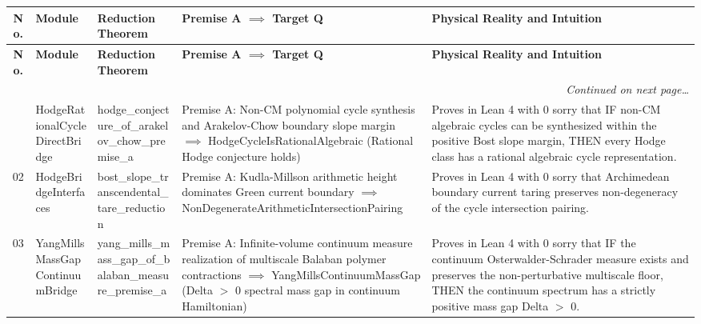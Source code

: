 \documentclass[11pt,a4paper]{article}
\begin{document}
\begin{longtable}{cp{2.8cm}>{\raggedright\arraybackslash}p{4.0cm}>{\raggedright\arraybackslash}p{4.0cm}>{\raggedright\arraybackslash}p{4.5cm}}
\toprule
\textbf{No.} & \textbf{Module} & \textbf{Reduction Theorem} & \textbf{Premise A $\implies$ Target Q} & \textbf{Physical Reality and Intuition} \\
\midrule
\endfirsthead
\toprule
\textbf{No.} & \textbf{Module} & \textbf{Reduction Theorem} & \textbf{Premise A $\implies$ Target Q} & \textbf{Physical Reality and Intuition} \\
\midrule
\endhead
\midrule
\multicolumn{5}{r}{\textit{Continued on next page\dots}} \\
\bottomrule
\endfoot
\bottomrule
\endlastfoot
01 & {\scriptsize\ttfamily Hodge\allowbreak Rational\allowbreak Cycle\allowbreak Direct\allowbreak Bridge} & {\scriptsize\ttfamily hodge\_\allowbreak conjecture\_\allowbreak of\_\allowbreak arakelov\_\allowbreak chow\_\allowbreak premise\_\allowbreak a} & {\scriptsize Premise A: Non-CM polynomial cycle synthesis and Arakelov-Chow boundary slope margin $\implies$ HodgeCycleIsRationalAlgebraic (Rational Hodge conjecture holds)} & Proves in Lean 4 with 0 sorry that IF non-CM algebraic cycles can be synthesized within the positive Bost slope margin, THEN every Hodge class has a rational algebraic cycle representation. \\
02 & {\scriptsize\ttfamily Hodge\allowbreak Bridge\allowbreak Interfaces} & {\scriptsize\ttfamily bost\_\allowbreak slope\_\allowbreak transcendental\_\allowbreak tare\_\allowbreak reduction} & {\scriptsize Premise A: Kudla-Millson arithmetic height dominates Green current boundary $\implies$ NonDegenerateArithmeticIntersectionPairing} & Proves in Lean 4 with 0 sorry that Archimedean boundary current taring preserves non-degeneracy of the cycle intersection pairing. \\
03 & {\scriptsize\ttfamily Yang\allowbreak Mills\allowbreak Mass\allowbreak Gap\allowbreak Continuum\allowbreak Bridge} & {\scriptsize\ttfamily yang\_\allowbreak mills\_\allowbreak mass\_\allowbreak gap\_\allowbreak of\_\allowbreak balaban\_\allowbreak measure\_\allowbreak premise\_\allowbreak a} & {\scriptsize Premise A: Infinite-volume continuum measure realization of multiscale Balaban polymer contractions $\implies$ YangMillsContinuumMassGap (Delta $>$ 0 spectral mass gap in continuum Hamiltonian)} & Proves in Lean 4 with 0 sorry that IF the continuum Osterwalder-Schrader measure exists and preserves the non-perturbative multiscale floor, THEN the continuum spectrum has a strictly positive mass gap Delta $>$ 0. \\

\end{longtable}
\end{document}
